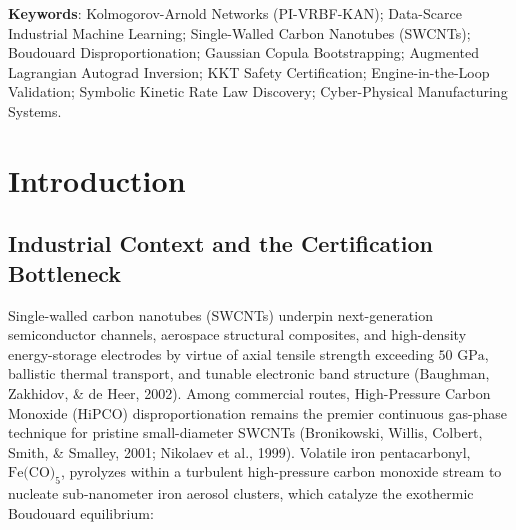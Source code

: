 \documentclass[10pt,journal,onecolumn]{IEEEtran}
\begin{document}
\begin{abstract}
$24.5\text{ ms}$—$153.2\times$ faster than genetic search, $63,092.4\times$ under $1,000$-query vectorization—with $0.0\%$ KKT violations ($0/1,000$) and $L_2$ tracking error $0.042$, certified engine-in-the-loop against the calibrated transport twin as the mandatory safety gate preceding live DCS write-access. Finally, $L_1$ edge pruning reduces the bipartite graph to its minimal active causal skeleton, from which BIC-penalized Levenberg-Marquardt snapping recovers closed-form rate laws with critical thresholds at $T^\textit{ = 1,042.00^\circ\text{C}$, $P_{\text{crit}} = 25.00\text{ atm}$, $Q_{\text{H2O}}^} = 18.20\text{ ppmv}$, and $Q_{\text{Fe}}^* = 220.00\text{ SLPM}$ ($R^2_{\text{sym}} \ge 0.994$), each corresponding to an independently documented Arrhenius, Langmuir-Hill, water-etching, or Ostwald-ripening mechanism.
\end{abstract}
\textbf{Keywords}: Kolmogorov-Arnold Networks (PI-VRBF-KAN); Data-Scarce Industrial Machine Learning; Single-Walled Carbon Nanotubes (SWCNTs); Boudouard Disproportionation; Gaussian Copula Bootstrapping; Augmented Lagrangian Autograd Inversion; KKT Safety Certification; Engine-in-the-Loop Validation; Symbolic Kinetic Rate Law Discovery; Cyber-Physical Manufacturing Systems.

\section{Introduction}
\subsection{Industrial Context and the Certification Bottleneck}
Single-walled carbon nanotubes (SWCNTs) underpin next-generation semiconductor channels, aerospace structural composites, and high-density energy-storage electrodes by virtue of axial tensile strength exceeding $50\text{ GPa}$, ballistic thermal transport, and tunable electronic band structure (Baughman, Zakhidov, & de Heer, 2002). Among commercial routes, High-Pressure Carbon Monoxide (HiPCO) disproportionation remains the premier continuous gas-phase technique for pristine small-diameter SWCNTs (Bronikowski, Willis, Colbert, Smith, & Smalley, 2001; Nikolaev et al., 1999). Volatile iron pentacarbonyl, $\text{Fe(CO)}_5$, pyrolyzes within a turbulent high-pressure carbon monoxide stream to nucleate sub-nanometer iron aerosol clusters, which catalyze the exothermic Boudouard equilibrium:
\end{document}
